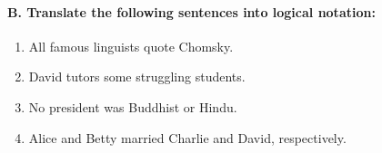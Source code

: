 {\paragraph*{B. Translate the following sentences into logical notation:}

\begin{enumerate}[label=\alph*.]
\item  {All famous linguists quote Chomsky.}
\item  {David tutors some struggling students.}
\item  {No president was Buddhist or Hindu.}
\item  {Alice and Betty married Charlie and David, respectively.}
\end{enumerate}
}